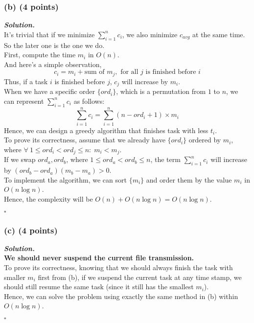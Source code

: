 \documentclass[12pt, a4paper, UTF8]{article}
\newenvironment{solution}[1][\it{Solution}]{\textbf{#1. }\\}{\begin{flushright}$\square$\end{flushright}}
\begin{document}
        \subsubsection*{(b) (4 points)}
            \begin{solution}
                It's trivial that if we minimize $\sum_{i = 1}^{n}{c_i}$, we also minimize $c_{avg}$ at the same time. So the later one is the one we do.\\
                First, compute the time ${m_i}$ in $O(n)$.\\
                And here's a simple observation, 
                $$c_i = m_i + \text{sum of } m_j,\text{ for all }j\text{ is finished before }i$$
                Thus, if a task $i$ is finished before $j$, $c_j$ will increase by $m_i$.\\
                When we have a specific order $\{ord_i\}$, which is a permutation from $1$ to $n$, we can represent $\sum_{i = 1}^{n}{c_i}$ as follows:
                $$\sum_{i = 1}^{n}{c_i} = \sum_{i = 1}^{n}{(n - ord_i + 1) \times m_i}$$
                Hence, we can design a greedy algorithm that finishes task with less $t_i$.\\
                To prove its correctness, assume that we already have $\{ord_i\}$ ordered by $m_i$, where $\forall\ 1 \le ord_i < ord_j \le n:\; m_i < m_j$.\\
                If we swap $ord_a, ord_b$, where $1 \le ord_a < ord_b \le n$, the term $\sum_{i = 1}^{n}{c_i}$ will increase by $(ord_b - ord_a)(m_b - m_a) > 0$.\\
                To implement the algorithm, we can sort $\{m_i\}$ and order them by the value $m_i$ in $O(n\log{n})$.\\ 
                Hence, the complexity will be $O(n) + O(n\log{n}) = O(n\log{n})$.
            \end{solution}
        \subsubsection*{(c) (4 points)}
            \begin{solution}
                \textbf{We should never suspend the current file transmission.}\\
                To prove its correctness, knowing that we should always finish the task with smaller $m_i$ first from (b), if we suspend the current task at any time stamp, we should still resume the same task (since it still has the smallest $m_i$).\\
                Hence, we can solve the problem using exactly the same method in (b) within $O(n\log{n})$.
            \end{solution}
\end{document}
